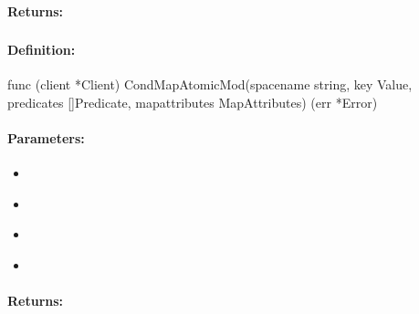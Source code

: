 \paragraph{Returns:}


\pagebreak
\subsubsection{}
\label{api:Go:CondMapAtomicMod}


\paragraph{Definition:}
\begin{gocode}
func (client *Client) CondMapAtomicMod(spacename string, key Value, predicates []Predicate, mapattributes MapAttributes) (err *Error)
\end{gocode}

\paragraph{Parameters:}
\begin{itemize}[noitemsep]
\item {}\\

\item {}\\

\item {}\\

\item {}\\

\end{itemize}

\paragraph{Returns:}


\pagebreak
\subsubsection{}
\label{api:Go:GroupMapAtomicMod}



